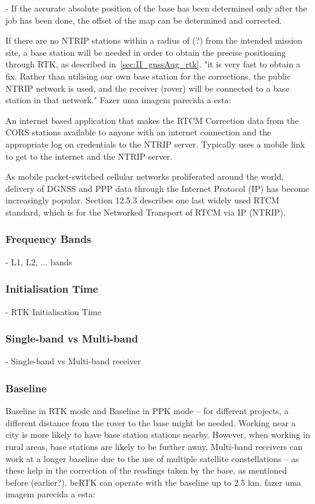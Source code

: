 - If the accurate absolute position of the base has been determined only after the job has been done, the offset of the map can be determined and corrected.


If there are no NTRIP stations within a radius of (?) from the intended mission site, a base station will be needed in order to obtain the precise positioning through RTK, as described in~\ref{sec:II_gnssAug_rtk}.
"it is very fast to obtain a fix. Rather than utilising our own base station for the corrections, the public NTRIP network is used, and the receiver (rover) will be connected to a base station in that network."
Fazer uma imagem parecida a esta: %

An internet based application that makes the RTCM Correction data from the CORS stations available to anyone with an internet connection and the appropriate log on credentials to the NTRIP server. Typically uses a mobile link to get to the internet and the NTRIP server. %

As mobile packet-switched cellular networks proliferated around the world,
delivery of DGNSS and PPP data through the Internet Protocol (IP) has become increasingly popular. Section 12.5.3 describes one last widely used RTCM standard,
which is for the Networked Transport of RTCM via IP (NTRIP).


\subsubsection{Frequency Bands}\label{sec:II_gnssAug_rtk_freqbands}
- L1, L2, ... bands

\subsubsection{Initialisation Time}\label{sec:II_gnssAug_rtk_inittime}
- RTK Initialisation Time

\subsubsection{Single-band vs Multi-band}\label{sec:II_gnssAug_rtk_smband}
- Single-band vs Multi-band receiver

\subsubsection{Baseline}\label{sec:II_gnssAug_rtk_baseline}
Baseline in RTK mode and Baseline in PPK mode -- for different projects, a different distance from the rover to the base might be needed. Working near a city is more likely to have base station stations nearby. However, when working in rural areas, base stations are likely to be further away.
Multi-band receivers can work at a longer baseline due to the use of multiple satellite constellations -- as these help in the correction of the readings taken by the base, as mentioned before (earlier?). beRTK can operate with the baseline up to 2.5 km.
fazer uma imagem parecida a esta:

